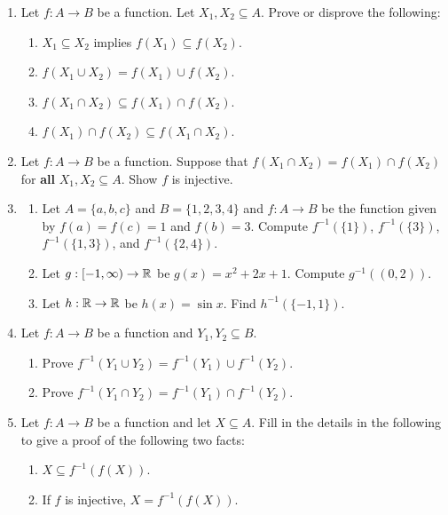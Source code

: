 \begin{exercises}
\begin{enumerate}
\item Let $f : A \to B$ be a function. Let $X_1,X_2 \subseteq A$. Prove or disprove the following:
\begin{enumerate}
    \item $X_1 \subseteq X_2$ implies $f(X_1) \subseteq f(X_2)$.
    \item $f(X_1 \cup X_2) = f(X_1) \cup f(X_2)$.
    \item $f(X_1 \cap X_2) \subseteq f(X_1) \cap f(X_2)$. 
    \item $f(X_1) \cap f(X_2) \subseteq f(X_1 \cap X_2)$.
\end{enumerate}

\item Let $f : A \to B$ be a function. Suppose that $f(X_1 \cap X_2) = f(X_1) \cap f(X_2)$ for \textbf{all} $X_1,X_2 \subseteq A$. Show $f$ is injective.

\item \begin{enumerate}
    \item Let $A = \{a,b,c\}$ and $B = \{1,2,3,4\}$ and $f : A \to B$ be the function given by $f(a) = f(c) = 1$ and $f(b) = 3$. Compute $f^{-1}(\{1\})$, $f^{-1}(\{3\})$, $f^{-1}(\{1,3\})$, and $f^{-1}(\{2,4\})$. 
    \item Let $g : [-1,\infty) \to \mathbb{R}$ be $g(x) = x^2 + 2x + 1$. Compute $g^{-1}((0,2))$. 
    \item Let $h : \mathbb{R} \to \mathbb{R}$ be $h(x) = \sin x$. Find $h^{-1}(\{-1,1\})$. 
\end{enumerate}

\item Let $f : A \to B$ be a function and $Y_1,Y_2 \subseteq B$.
\begin{enumerate}
\item Prove $f^{-1}(Y_1 \cup Y_2) = f^{-1}(Y_1) \cup f^{-1}(Y_2)$.
\item Prove $f^{-1}(Y_1 \cap Y_2) = f^{-1}(Y_1) \cap f^{-1}(Y_2)$.
\end{enumerate}

\item Let $f : A \to B$ be a function and let $X \subseteq A$. Fill in the details in the following to give a proof of the following two facts:
\begin{enumerate}
    \item $X \subseteq f^{-1}(f(X))$.
    \item If $f$ is injective, $X = f^{-1}(f(X))$.
\end{enumerate}


\end{enumerate}
\end{exercises}
